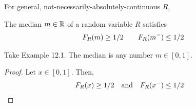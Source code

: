 \noindent For general, not-necessarily-absolutely-continuous $R$,
\begin{definition}
    The median $m \in \mathbb{R}$ of a random variable $R$ satisfies
    \begin{align}
        F_R(m) \ge 1/2 \qsp F_R(\ce{$m$-}) \le 1/2
    \end{align}
\end{definition}
\begin{example}
    Take Example 12.1. The median is any number $m \in [0,1]$.
    \begin{proof}
        Let $x \in [0,1]$. Then,
        \begin{align}
            F_R(x) \ge 1/2 \qand F_R(x^-) \le 1/2 & \qedhere
        \end{align}
    \end{proof}
\end{example}


